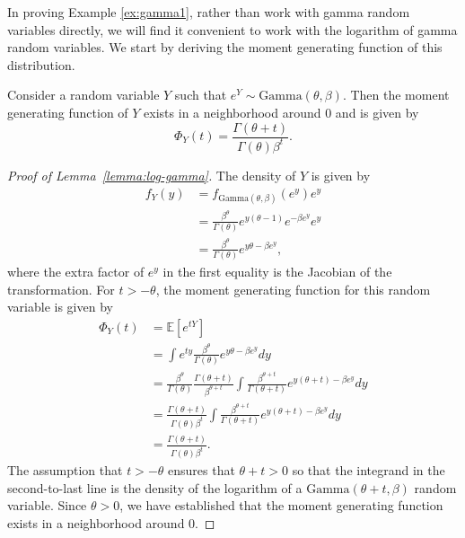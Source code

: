\documentclass[12pt]{article}
\begin{document}
In proving Example \ref{ex:gamma1}, rather than work with gamma random variables directly, we will find it convenient to work with the logarithm of gamma random variables. We start by deriving the moment generating function of this distribution.
\begin{lemma}\label{lemma:log-gamma}
Consider a random variable $Y$ such that $e^Y\sim \text{Gamma}(\theta, \beta)$.  Then the moment generating function of $Y$ exists in a neighborhood around 0 and is given by 
$$
\Phi_{Y}(t)=\frac{\Gamma(\theta+t)}{\Gamma(\theta)\beta^{t}}.
$$
\end{lemma}
\begin{proof}[Proof of Lemma~\ref{lemma:log-gamma}]
The density of $Y$ is given by
\begin{align*}
    f_Y(y)&=f_{\text{Gamma}(\theta, \beta)}(e^y)e^y\\
    &=\frac{\beta^\theta}{\Gamma(\theta)}e^{y(\theta-1)}e^{-\beta e^y}e^y\\
    &=\frac{\beta^\theta}{\Gamma(\theta)}e^{y\theta-\beta e^y},
\end{align*}
where the extra factor of $e^y$ in the first equality is the Jacobian of the transformation.  For $t>-\theta$, the moment generating function for this random variable is given by
\begin{align*}
\Phi_Y(t)&=\mathbb E[e^{tY}]\\
    &=\int e^{ty}\frac{\beta^\theta}{\Gamma(\theta)}e^{y\theta-\beta e^y}dy\\
    &=\frac{\beta^\theta}{\Gamma(\theta)}\frac{\Gamma(\theta+t)}{\beta^{\theta+t}}\int\frac{\beta^{\theta+t}}{\Gamma(\theta+t)} e^{y(\theta+t)-\beta e^y}dy\\
    &=\frac{\Gamma(\theta+t)}{\Gamma(\theta)\beta^{t}}\int\frac{\beta^{\theta+t}}{\Gamma(\theta+t)} e^{y(\theta+t)-\beta e^y}dy\\
    &=\frac{\Gamma(\theta+t)}{\Gamma(\theta)\beta^{t}}.
    \end{align*}
The assumption that $t>-\theta$ ensures that $\theta+t>0$ so that the integrand in the second-to-last line is the density of the logarithm of a $\text{Gamma}(\theta+t,\beta)$ random variable.  Since $\theta>0$, we have established that the moment generating function exists in a neighborhood around 0.
\end{proof}
\end{document}
